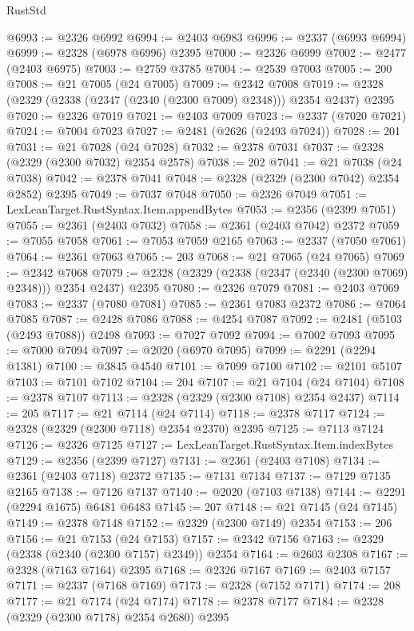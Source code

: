 \begin{lexlean}{RustStd}
\begin{coremodule}
{\begin{coremodule}
{{{{{{{{{{{{{{{{{{{{{{{{{{{{{{{{{{{{{@6993 := @2326 @6992
@6994 := @2403 @6983
@6996 := @2337 (@6993 @6994)
@6999 := @2328 (@6978 @6996) @2395
@7000 := @2326 @6999
@7002 := @2477 (@2403 @6975)
@7003 := @2759 @3785
@7004 := @2539 @7003
@7005 := 200
@7008 := @21 @7005 (@24 @7005)
@7009 := @2342 @7008
@7019 := @2328 (@2329 (@2338 (@2347 (@2340 (@2300 @7009) @2348))) @2354 @2437) @2395
@7020 := @2326 @7019
@7021 := @2403 @7009
@7023 := @2337 (@7020 @7021)
@7024 := @7004 @7023
@7027 := @2481 (@2626 (@2493 @7024))
@7028 := 201
@7031 := @21 @7028 (@24 @7028)
@7032 := @2378 @7031
@7037 := @2328 (@2329 (@2300 @7032) @2354 @2578)
@7038 := 202
@7041 := @21 @7038 (@24 @7038)
@7042 := @2378 @7041
@7048 := @2328 (@2329 (@2300 @7042) @2354 @2852) @2395
@7049 := @7037 @7048
@7050 := @2326 @7049
@7051 := LexLeanTarget.RustSyntax.Item.appendBytes
@7053 := @2356 (@2399 @7051)
@7055 := @2361 (@2403 @7032)
@7058 := @2361 (@2403 @7042) @2372
@7059 := @7055 @7058
@7061 := @7053 @7059 @2165
@7063 := @2337 (@7050 @7061)
@7064 := @2361 @7063
@7065 := 203
@7068 := @21 @7065 (@24 @7065)
@7069 := @2342 @7068
@7079 := @2328 (@2329 (@2338 (@2347 (@2340 (@2300 @7069) @2348))) @2354 @2437) @2395
@7080 := @2326 @7079
@7081 := @2403 @7069
@7083 := @2337 (@7080 @7081)
@7085 := @2361 @7083 @2372
@7086 := @7064 @7085
@7087 := @2428 @7086
@7088 := @4254 @7087
@7092 := @2481 (@5103 (@2493 @7088)) @2498
@7093 := @7027 @7092
@7094 := @7002 @7093
@7095 := @7000 @7094
@7097 := @2020 (@6970 @7095)
@7099 := @2291 (@2294 @1381)
@7100 := @3845 @4540
@7101 := @7099 @7100
@7102 := @2101 @5107
@7103 := @7101 @7102
@7104 := 204
@7107 := @21 @7104 (@24 @7104)
@7108 := @2378 @7107
@7113 := @2328 (@2329 (@2300 @7108) @2354 @2437)
@7114 := 205
@7117 := @21 @7114 (@24 @7114)
@7118 := @2378 @7117
@7124 := @2328 (@2329 (@2300 @7118) @2354 @2370) @2395
@7125 := @7113 @7124
@7126 := @2326 @7125
@7127 := LexLeanTarget.RustSyntax.Item.indexBytes
@7129 := @2356 (@2399 @7127)
@7131 := @2361 (@2403 @7108)
@7134 := @2361 (@2403 @7118) @2372
@7135 := @7131 @7134
@7137 := @7129 @7135 @2165
@7138 := @7126 @7137
@7140 := @2020 (@7103 @7138)
@7144 := @2291 (@2294 @1675) @6481 @6483
@7145 := 207
@7148 := @21 @7145 (@24 @7145)
@7149 := @2378 @7148
@7152 := @2329 (@2300 @7149) @2354
@7153 := 206
@7156 := @21 @7153 (@24 @7153)
@7157 := @2342 @7156
@7163 := @2329 (@2338 (@2340 (@2300 @7157) @2349)) @2354
@7164 := @2603 @2308
@7167 := @2328 (@7163 @7164) @2395
@7168 := @2326 @7167
@7169 := @2403 @7157
@7171 := @2337 (@7168 @7169)
@7173 := @2328 (@7152 @7171)
@7174 := 208
@7177 := @21 @7174 (@24 @7174)
@7178 := @2378 @7177
@7184 := @2328 (@2329 (@2300 @7178) @2354 @2680) @2395
}}}}}}}}}}}}}}}}}}}}}}}}}}}}}}}}}}}}}
\end{coremodule}}
\end{coremodule}
\end{lexlean}
